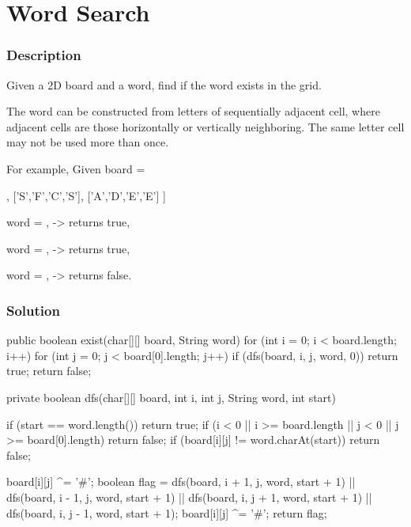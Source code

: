 \newpage


\section{Word Search} %

\subsubsection{Description}
Given a 2D board and a word, find if the word exists in the grid.

The word can be constructed from letters of sequentially adjacent cell, where adjacent cells are those horizontally or vertically neighboring. The same letter cell may not be used more than once.

For example,
Given board =
\begin{Code}
[
  ['A','B','C','E'],
  ['S','F','C','S'],
  ['A','D','E','E']
]
\end{Code}

word = , -> returns true,

word = , -> returns true,

word = , -> returns false.

\subsubsection{Solution}

\begin{Code}
public boolean exist(char[][] board, String word) {
    for (int i = 0; i < board.length; i++) {
        for (int j = 0; j < board[0].length; j++) {
            if (dfs(board, i, j, word, 0)) {
                return true;
            }
        }
    }
    return false;
}

private boolean dfs(char[][] board, int i, int j, String word, int start) {
    if (start == word.length()) {
        return true;
    }
    if (i < 0 || i >= board.length || j < 0 || j >= board[0].length) {
        return false;
    }
    if (board[i][j] != word.charAt(start)) {
        return false;
    }

    board[i][j] ^= '#';
    boolean flag = dfs(board, i + 1, j, word, start + 1)
            || dfs(board, i - 1, j, word, start + 1)
            || dfs(board, i, j + 1, word, start + 1)
            || dfs(board, i, j - 1, word, start + 1);
    board[i][j] ^= '#';
    return flag;
}
\end{Code}

